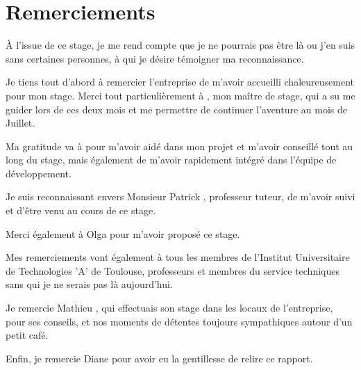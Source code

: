 \chapter*{Remerciements}
\`A l'issue de ce stage, je me rend compte que je ne pourrais pas être
là ou j'en suis sans certaines personnes, à qui je désire témoigner ma reconnaissance.

Je tiens tout d'abord à remercier l'entreprise \mbx{} de m'avoir accueilli chaleureusement pour mon stage.
Merci tout particulièrement à \Denis{}, mon maître de stage, qui a su me guider lors de ces deux mois et me permettre de continuer l'aventure au mois de Juillet.

Ma gratitude va à \Romain{} pour m'avoir aidé dans mon projet et m'avoir conseillé tout au long du stage, mais également de m'avoir rapidement intégré dans l'équipe de développement.

Je suis reconnaissant envers Monsieur Patrick , professeur tuteur, de m'avoir suivi et d'être venu au cours de ce stage.

Merci également à Olga  pour m'avoir proposé ce stage.

Mes remerciements vont également à tous les membres de l'Institut Universitaire de Technologies 'A' de Toulouse, professeurs et membres du service techniques sans qui je ne serais pas là aujourd'hui.

Je remercie Mathieu , qui effectuais son stage dans les locaux de l'entreprise, pour ses conseils, et nos moments de détentes toujours sympathiques autour d'un petit café.

Enfin, je remercie Diane  pour avoir eu la gentillesse de relire ce rapport.


